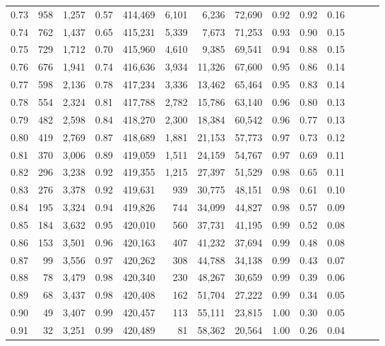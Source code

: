 \begin{tabular}{rrrrrrrrrrrrrr}
0.73 &    958 &  1,257 &  0.57 &  414,469 &    6,101 &   6,236 &  72,690 &  0.92 &  0.92 &      0.16 \\
0.74 &    762 &  1,437 &  0.65 &  415,231 &    5,339 &   7,673 &  71,253 &  0.93 &  0.90 &      0.15 \\
0.75 &    729 &  1,712 &  0.70 &  415,960 &    4,610 &   9,385 &  69,541 &  0.94 &  0.88 &      0.15 \\
0.76 &    676 &  1,941 &  0.74 &  416,636 &    3,934 &  11,326 &  67,600 &  0.95 &  0.86 &      0.14 \\
0.77 &    598 &  2,136 &  0.78 &  417,234 &    3,336 &  13,462 &  65,464 &  0.95 &  0.83 &      0.14 \\
0.78 &    554 &  2,324 &  0.81 &  417,788 &    2,782 &  15,786 &  63,140 &  0.96 &  0.80 &      0.13 \\
0.79 &    482 &  2,598 &  0.84 &  418,270 &    2,300 &  18,384 &  60,542 &  0.96 &  0.77 &      0.13 \\
0.80 &    419 &  2,769 &  0.87 &  418,689 &    1,881 &  21,153 &  57,773 &  0.97 &  0.73 &      0.12 \\
0.81 &    370 &  3,006 &  0.89 &  419,059 &    1,511 &  24,159 &  54,767 &  0.97 &  0.69 &      0.11 \\
0.82 &    296 &  3,238 &  0.92 &  419,355 &    1,215 &  27,397 &  51,529 &  0.98 &  0.65 &      0.11 \\
0.83 &    276 &  3,378 &  0.92 &  419,631 &      939 &  30,775 &  48,151 &  0.98 &  0.61 &      0.10 \\
0.84 &    195 &  3,324 &  0.94 &  419,826 &      744 &  34,099 &  44,827 &  0.98 &  0.57 &      0.09 \\
0.85 &    184 &  3,632 &  0.95 &  420,010 &      560 &  37,731 &  41,195 &  0.99 &  0.52 &      0.08 \\
0.86 &    153 &  3,501 &  0.96 &  420,163 &      407 &  41,232 &  37,694 &  0.99 &  0.48 &      0.08 \\
0.87 &     99 &  3,556 &  0.97 &  420,262 &      308 &  44,788 &  34,138 &  0.99 &  0.43 &      0.07 \\
0.88 &     78 &  3,479 &  0.98 &  420,340 &      230 &  48,267 &  30,659 &  0.99 &  0.39 &      0.06 \\
0.89 &     68 &  3,437 &  0.98 &  420,408 &      162 &  51,704 &  27,222 &  0.99 &  0.34 &      0.05 \\
0.90 &     49 &  3,407 &  0.99 &  420,457 &      113 &  55,111 &  23,815 &  1.00 &  0.30 &      0.05 \\
0.91 &     32 &  3,251 &  0.99 &  420,489 &       81 &  58,362 &  20,564 &  1.00 &  0.26 &      0.04 \\

\end{tabular}
